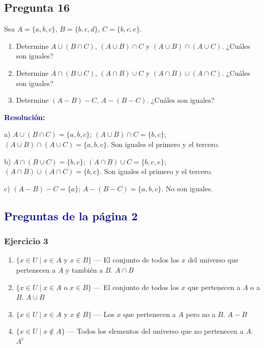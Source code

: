 \documentclass[12pt,a4paper]{article}
\newcommand{\resolucion}{\par\noindent\textbf{\textcolor{navy}{Resolución:}}\par}
\begin{document}
\subsection*{\textcolor{accent}{Pregunta 16}}
Sea $A=\{a,b,c\}$, $B=\{b,c,d\}$, $C=\{b,c,e\}$.
\begin{enumerate}[label=\alph*.]
  \item Determine $A\cup(B\cap C)$, $(A\cup B)\cap C$ y $(A\cup B)\cap(A\cup C)$. ¿Cuáles son iguales?
  \item Determine $A\cap(B\cup C)$, $(A\cap B)\cup C$ y $(A\cap B)\cup(A\cap C)$. ¿Cuáles son iguales?
  \item Determine $(A-B)-C$, $A-(B-C)$. ¿Cuáles son iguales?
\end{enumerate}
\resolucion
a) $A\cup(B\cap C)=\{a,b,c\}$; $(A\cup B)\cap C=\{b,c\}$; $(A\cup B)\cap(A\cup C)=\{a,b,c\}$. Son iguales el primero y el tercero.

b) $A\cap(B\cup C)=\{b,c\}$; $(A\cap B)\cup C=\{b,c,e\}$; $(A\cap B)\cup(A\cap C)=\{b,c\}$. Son iguales el primero y el tercero.

c) $(A-B)-C=\{a\}$; $A-(B-C)=\{a,b,c\}$. No son iguales.

\subsection*{\textcolor{navy}{Preguntas de la página 2}}

\subsubsection*{\textcolor{accent}{Ejercicio 3}}
\begin{enumerate}[label=3.\alph*]
  \item $\{x\in U\mid x\in A\text{ y }x\in B\}$ — El conjunto de todos los $x$ del universo que pertenecen a $A$ y también a $B$. \hfill $A\cap B$
  \item $\{x\in U\mid x\in A\text{ o }x\in B\}$ — El conjunto de todos los $x$ que pertenecen a $A$ o a $B$. \hfill $A\cup B$
  \item $\{x\in U\mid x\in A\text{ y }x\notin B\}$ — Los $x$ que pertenecen a $A$ pero no a $B$. \hfill $A-B$
  \item $\{x\in U\mid x\notin A\}$ — Todos los elementos del universo que no pertenecen a $A$. \hfill $A^c$
\end{enumerate}
\end{document}
